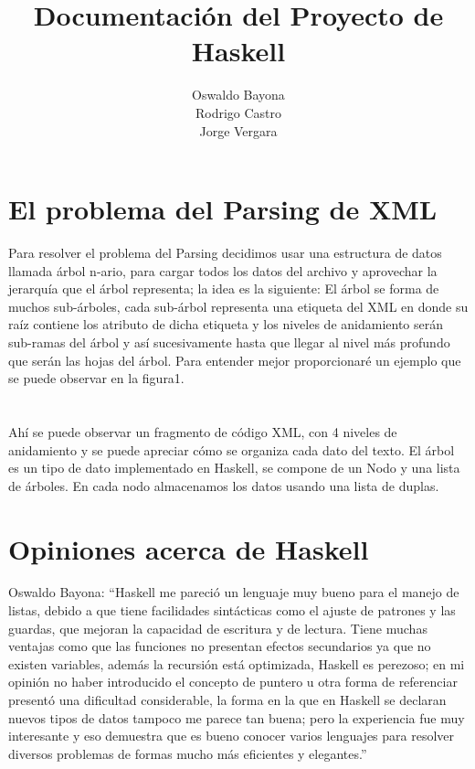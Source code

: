 \documentclass[11pt]{article} %
\title{Documentación del Proyecto de Haskell}
\author{Oswaldo Bayona\\Rodrigo Castro\\Jorge Vergara}
\begin{document}
\maketitle


\section{El problema del Parsing de XML}


Para resolver el problema del Parsing decidimos usar una estructura de datos llamada árbol n-ario, para cargar todos los datos del archivo y aprovechar la jerarquía que el árbol representa; la idea es la siguiente: El árbol se forma de muchos sub-árboles, cada sub-árbol representa una etiqueta del XML en donde su raíz contiene los atributo de dicha etiqueta y los niveles de anidamiento serán sub-ramas del árbol y así sucesivamente hasta que llegar al nivel más profundo que serán las hojas del árbol. Para entender mejor proporcionaré un ejemplo que se puede observar en la figura1.\\\\\\Ahí se puede observar un fragmento de código XML, con 4 niveles de anidamiento y se puede apreciar cómo se organiza cada dato del texto. El árbol es un tipo de dato implementado en Haskell, se compone de un Nodo y una lista de árboles. En cada nodo almacenamos los datos usando una lista de duplas.







\section{Opiniones acerca de Haskell}

Oswaldo Bayona: “Haskell me pareció un lenguaje muy bueno para el manejo de listas, debido a que tiene facilidades sintácticas como el ajuste de patrones y las guardas, que mejoran la capacidad de escritura y de lectura. Tiene muchas ventajas como que las funciones no presentan efectos secundarios ya que  no existen variables, además la recursión está optimizada, Haskell es perezoso;  en mi opinión no haber introducido el concepto de puntero u otra forma de referenciar presentó una dificultad considerable,  la forma en la que en Haskell se declaran nuevos  tipos de datos tampoco me parece tan buena;  pero la experiencia fue muy interesante y eso demuestra que  es bueno conocer varios lenguajes para resolver diversos problemas de formas mucho más eficientes y elegantes.”
\end{document}

